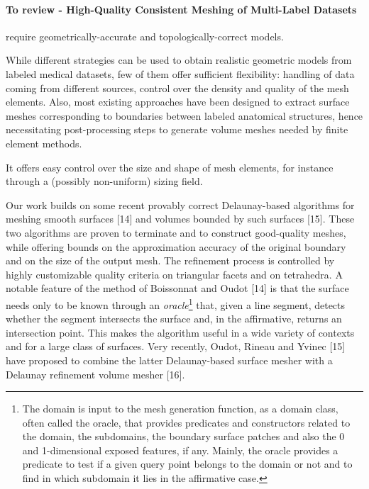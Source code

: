 \paragraph{To review - High-Quality Consistent Meshing of Multi-Label Datasets}
{


require geometrically-accurate and topologically-correct models. 


While different strategies can be used to obtain realistic geometric models from labeled medical datasets, few of them offer sufficient flexibility: handling of data coming from different sources, control over the density and quality of the mesh elements. Also, most existing approaches have been designed to extract surface meshes corresponding to boundaries between labeled anatomical structures, hence necessitating post-processing steps to generate volume meshes needed by finite element methods.

 It offers easy control over the size and shape of mesh elements, for instance through a (possibly non-uniform) sizing field.

Our work builds on some recent provably correct Delaunay-based algorithms for meshing smooth surfaces [14] and volumes bounded by such surfaces [15]. These two algorithms are proven to terminate and to construct good-quality meshes, while offering bounds on the approximation accuracy of the original boundary and on the size of the output mesh. The refinement process is controlled by highly customizable quality criteria on triangular facets and on tetrahedra. A notable feature of the method of Boissonnat and Oudot [14] is that the surface needs only to be known through an {\it oracle}\footnote{The domain is input to the mesh generation function, as a domain class, often called the oracle, that provides predicates and constructors related to the domain, the subdomains, the boundary surface patches and also the 0 and 1-dimensional exposed features, if any. Mainly, the oracle provides a predicate to test if a given query point belongs to the domain or not and to find in which subdomain it lies in the affirmative case.} that, given a line segment, detects whether the segment intersects the surface and, in the affirmative, returns an intersection point. This makes the algorithm useful in a wide variety of contexts and for a large class of surfaces. Very recently, Oudot, Rineau and Yvinec [15] have proposed to combine the latter Delaunay-based surface mesher with a Delaunay refinement volume mesher [16].

}
